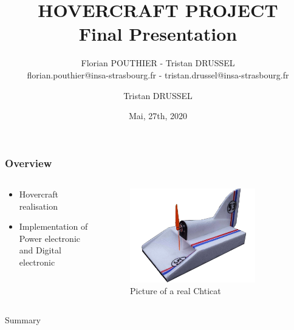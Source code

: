 \documentclass{beamer}
\title[Final Presentation]{HOVERCRAFT PROJECT\\Final Presentation}
\author[]{Florian POUTHIER - Tristan DRUSSEL\\ \tiny florian.pouthier@insa-strasbourg.fr - tristan.drussel@insa-strasbourg.fr}
\date{Mai, 27th, 2020}
\institute{4th Year Electrical Engineering \\ INSA Strasbourg}
\begin{document}
	\begin{frame}
		\titlepage
	\end{frame}
	\author[]{Tristan DRUSSEL}
	\begin{frame}
		\frametitle{Overview}
		\begin{columns}[T]
	  		\begin{column}{0.5\textwidth}
	  		\begin{itemize}
	  			\item Hovercraft realisation
				\item Implementation of Power electronic and Digital electronic
	  		\end{itemize}
	  		\end{column}
	  		\begin{column}{0.5\textwidth}
	  			\begin{figure}
	    			\includegraphics[width=0.8\textwidth]{../Illus/Chticat.png}
	    			\caption{Picture of a real Chticat}
	    		 \end{figure}
	  		\end{column}
		\end{columns}
	\end{frame}
	\begin{frame}{Summary}
		\setcounter{tocdepth}{1}
		\tableofcontents
	\end{frame}
\end{document}
